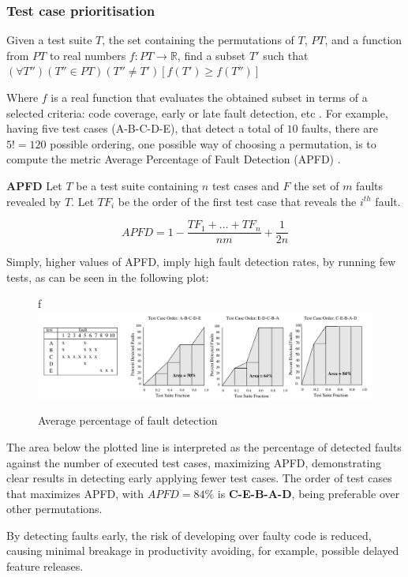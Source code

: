 \subsubsection{Test case prioritisation}

\theoremstyle{definition}
\begin{definition}{}
	Given a test suite $T$, the set containing the permutations of $T$, $PT$, and a function from $PT$ to real numbers $f : PT \rightarrow \mathbb{R}$, find a subset $T'$ such that $(\forall T'')(T'' \in PT)(T'' \neq T')[f(T') \ge f(T'')] $ 
\end{definition}

Where $f$ is a real function that evaluates the obtained subset in terms of a selected criteria: code coverage, early or late fault detection, etc \cite{ShinThesis}. For example, having five test cases (A-B-C-D-E), that detect a total of $10$ faults, there are $5! = 120$ possible ordering, one possible way of choosing a permutation, is to compute the metric Average Percentage of Fault Detection (APFD) \cite{APFD}. 

\theoremstyle{definition}
\begin{definition}{\textbf{APFD}}
	Let $T$ be a test suite containing $n$ test cases and $F$ the set of $m$ faults revealed by $T$. Let $TF_i$ be the order of the first test case that reveals the $i^{th}$ fault.\cite{ShinThesis}
\end{definition}

\begin{equation*}
	APFD = 1 - \frac{TF_{1}+\dots+TF_{n}}{nm} + \frac{1}{2n}
\end{equation*}

Simply, higher values of APFD, imply high fault detection rates, by running few tests, as can be seen in the following plot:

\begin{figure}[h]
	\centering
	f	\includegraphics[scale=0.5, width=\linewidth]{figures/APFD.png}
	\caption{Average percentage of fault detection \cite{APFD}}
	\label{APFD}
\end{figure} 

The area below the plotted line is interpreted as the percentage of detected faults against the number of executed test cases, maximizing APFD, demonstrating clear results in detecting early applying fewer test cases. The order of test cases that maximizes APFD, with $ APFD = 84 \%$ is \textbf{C-E-B-A-D}, being preferable over other permutations.
\par By detecting faults early, the risk of developing over faulty code is reduced, causing minimal breakage in productivity avoiding, for example, possible delayed feature releases.\cite{Uber}


